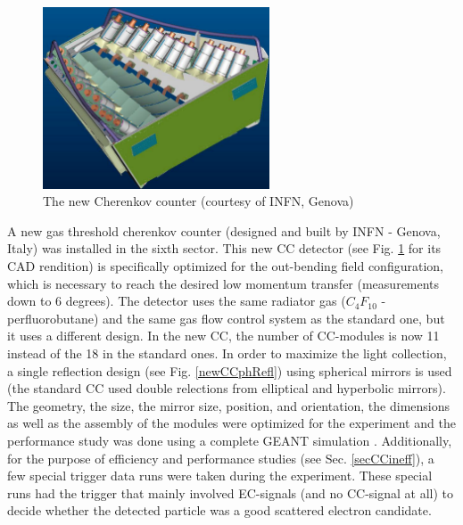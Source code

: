 \begin{figure}[h] %
\centering
\leavevmode \includegraphics[width=0.6\textwidth]{figuresEG4/FigExp/assieme_totaleCut.pdf}  %
\caption[New Cherenkov counter]{The new Cherenkov counter (courtesy of INFN, Genova)}
\label{nwCcCAD}
\end{figure}



A new gas threshold cherenkov counter (designed and built by INFN - Genova, Italy) was installed in the sixth sector. %
This new CC detector (see Fig. \ref{nwCcCAD} for its CAD rendition) is specifically optimized for the out-bending field configuration, which is necessary to reach the desired low momentum transfer (measurements down to 6 degrees). The detector uses the same radiator gas ($C_4 F_{10}$ - perfluorobutane) and the same gas flow control system as the standard %
one, but it uses a %
different design. %
In the new CC, the number of CC-modules %
is now 11 instead of the 18 in the standard ones. In order to maximize the light collection, a single reflection design (see Fig. \ref{newCCphRefl}) using spherical mirrors is used (the standard CC used double relections from elliptical and hyperbolic mirrors). The geometry, the size, the mirror size, position, and orientation, the dimensions as well as the assembly of the modules were optimized for the experiment %
and the performance study was %
done using a complete GEANT simulation \cite{propE03_006}. Additionally, for the purpose of efficiency and performance studies (see Sec. \ref{secCCineff}), a few special trigger data runs were taken during the experiment. These special runs had the trigger that mainly involved EC-signals (and no CC-signal at all) to decide whether the detected particle was a good scattered electron candidate.


